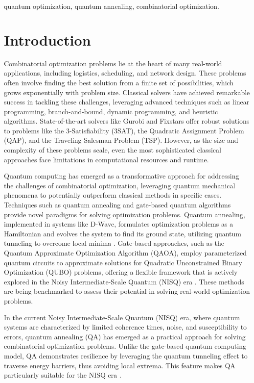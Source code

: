 \documentclass[conference]{IEEEtran}
\begin{document}
\begin{IEEEkeywords}
quantum optimization, quantum annealing, combinatorial optimization.
\end{IEEEkeywords}

\section{Introduction}
Combinatorial optimization problems lie at the heart of many real-world applications, including logistics, scheduling, and network design. 
These problems often involve finding the best solution from a finite set of possibilities, which grows exponentially with problem size. 
Classical solvers have achieved remarkable success in tackling these challenges, leveraging advanced techniques such as linear programming, branch-and-bound, dynamic programming, and heuristic algorithms. 
State-of-the-art solvers like Gurobi and Fixstars offer robust solutions to problems like the 3-Satisfiability (3SAT), the Quadratic Assignment Problem (QAP), and the Traveling Salesman Problem (TSP). 
However, as the size and complexity of these problems scale, even the most sophisticated classical approaches face limitations in computational resources and runtime.

Quantum computing has emerged as a transformative approach for addressing the challenges of combinatorial optimization, leveraging quantum mechanical phenomena to potentially outperform classical methods in specific cases. 
Techniques such as quantum annealing and gate-based quantum algorithms provide novel paradigms for solving optimization problems. 
Quantum annealing, implemented in systems like D-Wave, formulates optimization problems as a Hamiltonian and evolves the system to find its ground state, utilizing quantum tunneling to overcome local minima \cite{pelofske2024comparinggenerationsdwavequantum}. 
Gate-based approaches, such as the Quantum Approximate Optimization Algorithm (QAOA), employ parameterized quantum circuits to approximate solutions for Quadratic Unconstrained Binary Optimization (QUBO) problems, offering a flexible framework that is actively explored in the Noisy Intermediate-Scale Quantum (NISQ) era \cite{farhi2014quantumapproximateoptimizationalgorithm}. 
These methods are being benchmarked to assess their potential in solving real-world optimization problems.

In the current Noisy Intermediate-Scale Quantum (NISQ) era, where quantum systems are characterized by limited coherence times, noise, and susceptibility to errors, quantum annealing (QA) has emerged as a practical approach for solving combinatorial optimization problems. 
Unlike the gate-based quantum computing model, QA demonstrates resilience by leveraging the quantum tunneling effect to traverse energy barriers, thus avoiding local extrema. 
This feature makes QA particularly suitable for the NISQ era \cite{9860117}.
\end{document}

